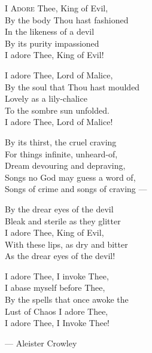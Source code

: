 \vspace*{\fill}

\begin{Verse}
I \textsc{Adore} Thee, King of Evil,\\
By the body Thou hast fashioned\\
In the likeness of a devil\\
By its purity impassioned\\
I adore Thee, King of Evil!

I adore Thee, Lord of Malice,\\
By the soul that Thou hast moulded\\
Lovely as a lily-chalice\\
To the sombre sun unfolded.\\
I adore Thee, Lord of Malice!

By its thirst, the cruel craving\\
For things infinite, unheard-of,\\
Dream devouring and depraving,\\
Songs no God may guess a word of,\\
Songs of crime and songs of craving ---

By the drear eyes of the devil\\
Bleak and sterile as they glitter\\
I adore Thee, King of Evil,\\
With these lips, as dry and bitter\\
As the drear eyes of the devil!

I adore Thee, I invoke Thee,\\
I abase myself before Thee,\\
By the spells that once awoke the \\
Lust of Chaos I adore Thee, \\
I adore Thee, I Invoke Thee!

\centering
--- Aleister Crowley
\par
\end{Verse}
\vspace*{\fill}
